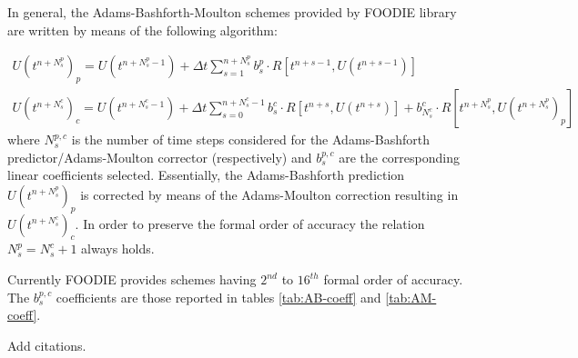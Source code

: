 In general, the Adams-Bashforth-Moulton schemes provided by FOODIE library are written by means of the following algorithm:

\begin{equation}
  \begin{matrix}
    U\left(t^{n+N_s^p}\right)_p = U\left(t^{n+N_s^p-1}\right) +\Delta t \sum_{s=1}^{n+N_s^p}{ b_s^p \cdot R\left[t^{n+s-1}, U\left(t^{n+s-1}\right)\right]}   \\
    U\left(t^{n+N_s^c}\right)_c = U\left(t^{n+N_s^c-1}\right) +\Delta t \sum_{s=0}^{n+N_s^c-1}{ b_s^c \cdot R\left[t^{n+s}, U\left(t^{n+s}\right)\right]} + b_{N_s^c}^c\cdot R\left[t^{n+N_s^p}, U\left(t^{n+N_s^p}\right)_p\right]
  \end{matrix}
\label{eq:ABM}
\end{equation}
where $N_s^{p,c}$ is the number of time steps considered for the Adams-Bashforth predictor/Adams-Moulton corrector (respectively) and $b_s^{p,c}$ are the corresponding linear coefficients selected. Essentially, the Adams-Bashforth prediction $U\left(t^{n+N_s^p}\right)_p$ is corrected by means of the Adams-Moulton correction resulting in $U\left(t^{n+N_s^c}\right)_c$. In order to preserve the formal order of accuracy the relation $N_s^p=N_s^c+1$ always holds.

Currently FOODIE provides schemes having $2^{nd}$ to $16^{th}$ formal order of accuracy. The $b_s^{p,c}$ coefficients are those reported in tables \ref{tab:AB-coeff} and \ref{tab:AM-coeff}.

{\color{red} Add citations.}
